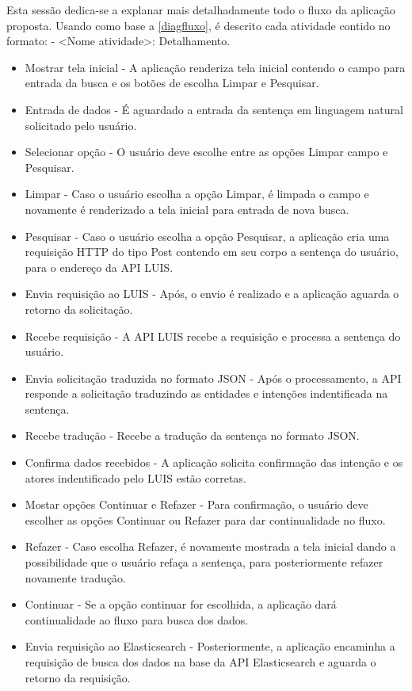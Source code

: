 Esta sessão dedica-se a explanar mais detalhadamente todo o fluxo da aplicação proposta. Usando como base a \autoref{diagfluxo}, é descrito cada atividade contido no formato: - <Nome atividade>: Detalhamento.

\clearpage
\begin{itemize}
	\item Mostrar tela inicial - A aplicação renderiza tela inicial contendo o campo para entrada da busca e os botões de escolha Limpar e Pesquisar.
	\item Entrada de dados - É aguardado a entrada da sentença em linguagem natural solicitado pelo usuário.
	\item Selecionar opção - O usuário deve escolhe entre as opções Limpar campo e Pesquisar.
	\item Limpar - Caso o usuário escolha a opção Limpar, é limpada o campo e novamente é renderizado a tela inicial para entrada de nova busca.
	\item Pesquisar - Caso o usuário escolha a opção Pesquisar, a aplicação cria uma requisição HTTP do tipo Post contendo em seu corpo a sentença do usuário, para o endereço da API LUIS.
	\item Envia requisição ao LUIS - Após, o envio é realizado e a aplicação aguarda o retorno da solicitação.
	\item Recebe requisição - A API LUIS recebe a requisição e processa a sentença do usuário.
	\item Envia solicitação traduzida no formato JSON - Após o processamento, a API responde a solicitação traduzindo as entidades e intenções indentificada na sentença.
	\item Recebe tradução - Recebe a tradução da sentença no formato JSON.
	\item Confirma dados recebidos - A aplicação solicita confirmação das intenção e os atores indentificado pelo LUIS estão corretas.
	\item Mostar opções Continuar e Refazer - Para confirmação, o usuário deve escolher as opções Continuar ou Refazer para dar continualidade no fluxo.
	\item Refazer - Caso escolha Refazer, é novamente mostrada a tela inicial dando a possibilidade que o usuário refaça a sentença, para posteriormente refazer novamente tradução.
	\item Continuar - Se a opção continuar for escolhida, a aplicação dará continualidade ao fluxo para busca dos dados.
	\item Envia requisição ao Elasticsearch - Posteriormente, a aplicação encaminha a requisição  de busca dos dados na base da API Elasticsearch e aguarda o retorno da requisição.

\end{itemize}
